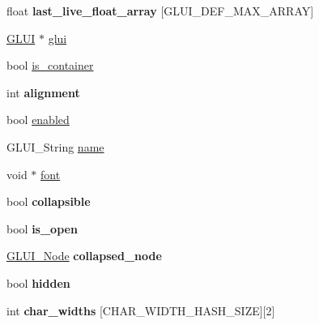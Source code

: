 \begin{DoxyCompactItemize}
\item 
\hypertarget{classGLUI__Control_a719177af6b52ae3373d2b3c30430ff58}{float {\bfseries last\-\_\-live\-\_\-float\-\_\-array} \mbox{[}G\-L\-U\-I\-\_\-\-D\-E\-F\-\_\-\-M\-A\-X\-\_\-\-A\-R\-R\-A\-Y\mbox{]}}\label{classGLUI__Control_a719177af6b52ae3373d2b3c30430ff58}

\item 
\hyperlink{classGLUI}{G\-L\-U\-I} $\ast$ \hyperlink{classGLUI__Control_ac731aebe26d7eb0b916a9692229f0eb6}{glui}
\item 
bool \hyperlink{classGLUI__Control_ac667bec4efbc9bdbf3e246b4471fb4cb}{is\-\_\-container}
\item 
\hypertarget{classGLUI__Control_a5d352c36d6bad2a1eaf9795bba00b7e7}{int {\bfseries alignment}}\label{classGLUI__Control_a5d352c36d6bad2a1eaf9795bba00b7e7}

\item 
bool \hyperlink{classGLUI__Control_a834202682d00a31a2141eae6709d37e1}{enabled}
\item 
G\-L\-U\-I\-\_\-\-String \hyperlink{classGLUI__Control_aa95b97d50df45335fc33f0af03958eb3}{name}
\item 
void $\ast$ \hyperlink{classGLUI__Control_a132273406b5ea6d95cd26501fc2f2027}{font}
\item 
\hypertarget{classGLUI__Control_a7a6528f287b80bed5861625eda4e5cad}{bool {\bfseries collapsible}}\label{classGLUI__Control_a7a6528f287b80bed5861625eda4e5cad}

\item 
\hypertarget{classGLUI__Control_a3e4e35edfa04ce71c090bdb849b7642c}{bool {\bfseries is\-\_\-open}}\label{classGLUI__Control_a3e4e35edfa04ce71c090bdb849b7642c}

\item 
\hypertarget{classGLUI__Control_a0f32f9b712ae3233f914d02738c43e7f}{\hyperlink{classGLUI__Node}{G\-L\-U\-I\-\_\-\-Node} {\bfseries collapsed\-\_\-node}}\label{classGLUI__Control_a0f32f9b712ae3233f914d02738c43e7f}

\item 
\hypertarget{classGLUI__Control_aec1b041f28d8ee36a0241dde827fea21}{bool {\bfseries hidden}}\label{classGLUI__Control_aec1b041f28d8ee36a0241dde827fea21}

\item 
\hypertarget{classGLUI__Control_a3b24d8c0f29ab6fc2318278543906cb5}{int {\bfseries char\-\_\-widths} \mbox{[}C\-H\-A\-R\-\_\-\-W\-I\-D\-T\-H\-\_\-\-H\-A\-S\-H\-\_\-\-S\-I\-Z\-E\mbox{]}\mbox{[}2\mbox{]}}\label{classGLUI__Control_a3b24d8c0f29ab6fc2318278543906cb5}

\end{DoxyCompactItemize}
